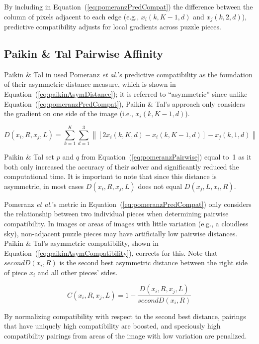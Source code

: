 \documentclass{report}
\def\eref#1{(\ref{#1})}
\newcommand{\norm}[1]{\left\lVert#1\right\rVert}
\begin{document}
By including in Equation~\eref{eq:pomeranzPredCompat} the difference between the column of pixels adjacent to each edge (e.g., $x_i(k, K-1, d)$ and $x_j(k, 2, d)$), predictive compatibility adjusts for local gradients across puzzle pieces.

\subsection{Paikin \& Tal Pairwise Affinity}\label{sec:paikinPairwiseAffinity}

Paikin \& Tal in \cite{paikin2015} used Pomeranz \textit{et al.}'s predictive compatibility as the foundation of their asymmetric distance measure, which is shown in Equation~\eref{eq:paikinAsymDistance}; it is referred to ``asymmetric'' since unlike Equation~\eref{eq:pomeranzPredCompat}, Paikin \& Tal's approach only considers the gradient on one side of the image (i.e., $x_i(k, K-1, d)$).

\begin{equation} \label{eq:paikinAsymDistance}
D(x_i,R,x_j,L) = \sum_{k=1}^{K}\sum_{d=1}^{3} \norm{[2x_i(k, K, d) - x_i(k, K-1, d)] - x_j(k, 1, d)}
\end{equation}

\noindent
Paikin \& Tal set $p$ and $q$ from Equation~\eref{eq:pomeranzPairwise} equal to~1 as it both only increased the accuracy of their solver and significantly reduced the computational time.  It is important to note that since this distance is asymmetric, in most cases $D(x_i,R,x_j,L)$ does not equal $D(x_j,L,x_i,R)$.

Pomeranz \textit{et al.}'s metric in Equation~\eref{eq:pomeranzPredCompat} only considers the relationship between two individual pieces when determining pairwise compatibility.  In images or areas of images with little variation (e.g., a cloudless sky), non-adjacent puzzle pieces may have artificially low pairwise distances.  Paikin \& Tal's asymmetric compatibility, shown in Equation~\eref{eq:paikinAsymCompatibility}, corrects for this.  Note that $secondD(x_i,R)$ is the second best asymmetric distance between the right side of piece $x_i$ and all other pieces' sides. 

\begin{equation} \label{eq:paikinAsymCompatibility}
C(x_i,R,x_j,L) = 1 - \frac{D(x_i,R,x_j,L)}{secondD(x_i,R)}
\end{equation}

\noindent
By normalizing compatibility with respect to the second best distance, pairings that have uniquely high compatibility are boosted, and speciously high compatibility pairings from areas of the image with low variation are penalized.
\end{document}

